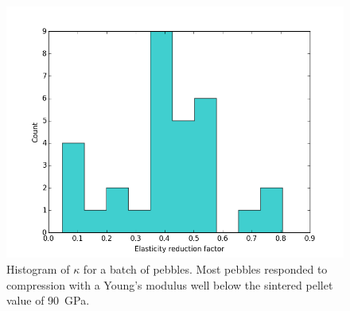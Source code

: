 \begin{figure}[!t]
\centering
    \includegraphics[width=\doubleimagewidth]{chapters/figures/fzk-kappa-histogram.png}
    \caption{Histogram of $\kappa$ for a batch of \lis pebbles. Most pebbles responded to compression with a Young's modulus well below the sintered pellet value of \si{90 GPa}.}
    \label{fig:fzk-kappa-hist}
\end{figure}

